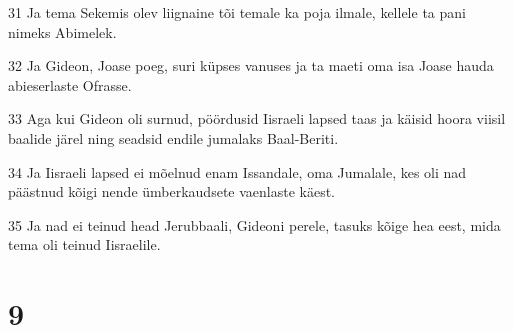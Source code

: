 \par 31 Ja tema Sekemis olev liignaine tõi temale ka poja ilmale, kellele ta pani nimeks Abimelek.
\par 32 Ja Gideon, Joase poeg, suri küpses vanuses ja ta maeti oma isa Joase hauda abieserlaste Ofrasse.
\par 33 Aga kui Gideon oli surnud, pöördusid Iisraeli lapsed taas ja käisid hoora viisil baalide järel ning seadsid endile jumalaks Baal-Beriti.
\par 34 Ja Iisraeli lapsed ei mõelnud enam Issandale, oma Jumalale, kes oli nad päästnud kõigi nende ümberkaudsete vaenlaste käest.
\par 35 Ja nad ei teinud head Jerubbaali, Gideoni perele, tasuks kõige hea eest, mida tema oli teinud Iisraelile.

\chapter{9}

